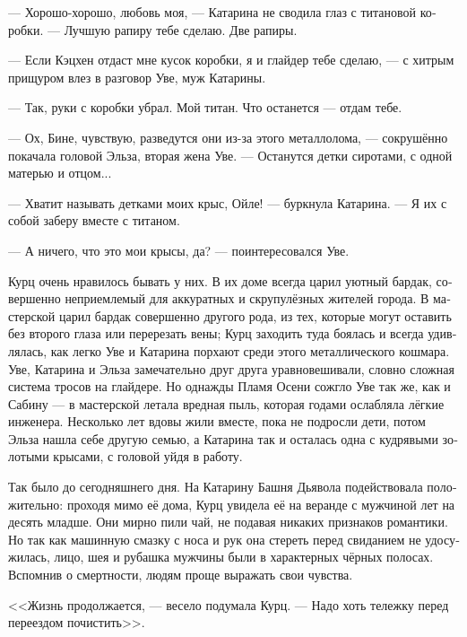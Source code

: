 \documentclass[a4paper,12pt,fleqn]{book}\usepackage{polyglossia}\setdefaultlanguage[babelshorthands=true]{russian}\setotherlanguage{english}\defaultfontfeatures{Ligatures=TeX,Mapping=tex-text}\usepackage{xcolor}\newcommand{\ml}[3]{#2}
\begin{document}
--- Хорошо-хорошо, любовь моя, --- Катарина не сводила глаз с титановой коробки.
--- Лучшую рапиру тебе сделаю.
Две рапиры.

\ml{$0$}
{--- Если Кэцхен отдаст мне кусок коробки, я и глайдер тебе сделаю, --- с хитрым прищуром влез в разговор Уве, муж Катарины.}
{``If K\"{a}tzchen gives me a piece of the box, I'll make you a gleider on top of that,'' said Uwe, Katarina's husband.}

\ml{$0$}
{--- Так, руки с коробки убрал.}
{``Hands off the box.}
\ml{$0$}
{Мой титан.}
{My titanium.}
\ml{$0$}
{Что останется --- отдам тебе.}
{I'll give you what's left.''}

--- Ох, Бине, чувствую, разведутся они из-за этого металлолома, --- сокрушённо покачала головой Эльза, вторая жена Уве.
--- Останутся детки сиротами, с одной матерью и отцом...

--- Хватит называть детками моих крыс, Ойле! --- буркнула Катарина. %
--- Я их с собой заберу вместе с титаном.

--- А ничего, что это мои крысы, да? --- поинтересовался Уве.

Курц очень нравилось бывать у них.
В их доме всегда царил уютный бардак, совершенно неприемлемый для аккуратных и скрупулёзных жителей города.
В мастерской царил бардак совершенно другого рода, из тех, которые могут оставить без второго глаза или перерезать вены;
Курц заходить туда боялась и всегда удивлялась, как легко Уве и Катарина порхают среди этого металлического кошмара.
Уве, Катарина и Эльза замечательно друг друга уравновешивали, словно сложная система тросов на глайдере.
Но однажды Пламя Осени сожгло Уве так же, как и Сабину --- в мастерской летала вредная пыль, которая годами ослабляла лёгкие инженера.
Несколько лет вдовы жили вместе, пока не подросли дети, потом Эльза нашла себе другую семью, а Катарина так и осталась одна с кудрявыми золотыми крысами, с головой уйдя в работу.

Так было до сегодняшнего дня.
На Катарину Башня Дьявола подействовала положительно: проходя мимо её дома, Курц увидела её на веранде с мужчиной лет на десять младше.
Они мирно пили чай, не подавая никаких признаков романтики.
Но так как машинную смазку с носа и рук она стереть перед свиданием не удосужилась, лицо, шея и рубашка мужчины были в характерных чёрных полосах.
Вспомнив о смертности, людям проще выражать свои чувства.

<<Жизнь продолжается, --- весело подумала Курц.
--- Надо хоть тележку перед переездом почистить>>.
\end{document}
